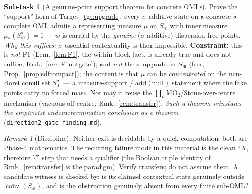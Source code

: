 \documentclass[11pt]{article}
\theoremstyle{definition}
\newtheorem{task}{Sub-task}
\theoremstyle{remark}
\newtheorem{remark}[theorem]{Remark}
\newcommand{\MOO}{\mathrm{MO}_2}
\newcommand{\df}{\mathrm{df}}            %
\newcommand{\conv}{\overline{\operatorname{conv}}}
\begin{document}
\begin{task}[A genuine-point support theorem for concrete OMLs]\label{task:impossible}
Prove the ``support'' horn of Target~\ref{tgt:upgrade}: every $\sigma$-additive state
on a concrete $\sigma$-complete OML admits a representing measure $\mu$ on $S_{\df}$
with inner measure $\mu_{*}(S_{\df}^{\sigma})=1$ --- $w$ is carried by the
\emph{genuine} ($\sigma$-additive) dispersion-free points. \emph{Why this suffices:}
$\sigma$-essential contextuality is then impossible.
\textbf{Constraint:} this is \emph{not} F1 (Lem.~\ref{lem:F1}, the within-block fact,
is already true and does not suffice, Rmk.~\ref{rem:F1notgate}), and \emph{not} the
$\sigma$-upgrade on $S_{\df}$ (free, Prop.~\ref{prop:sdfcompact}); the content is that
$\mu$ can be \emph{concentrated} on the non-Borel conull set $S_{\df}^{\sigma}$ --- a
measure-support / $\mathrm{add}(\mathrm{null})$ statement where the fake points carry
no forced mass. Nor may it reuse the $\prod_n\MOO$/Stone-over-centre mechanism
(vacuous off-centre, Rmk.~\ref{rem:transfer}). \emph{Such a theorem reinstates the
empiricist-underdetermination conclusion as a theorem}
(\texttt{direction2\_gate\_finding.md}).
\end{task}

\begin{remark}[Discipline]\label{rem:discipline}
Neither exit is decidable by a quick computation; both are Phase-4 mathematics. The
recurring failure mode in this material is the clean ``$X$, therefore $Y$'' step
that needs a qualifier (the Boolean triple identity of Rmk.~\ref{rem:transfer} is
the paradigm). Verify transfers; do not assume them. A candidate witness is checked
by: is its claimed contextual state genuinely outside $\conv(S_{\df})$, and is the
obstruction genuinely absent from every finite sub-OML?
\end{remark}



\end{document}
